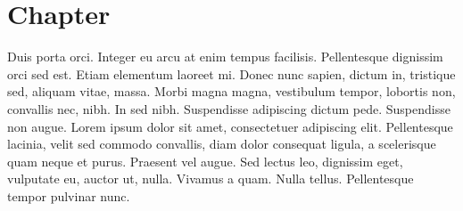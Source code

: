 \chapter{Chapter}

Duis porta orci. Integer eu arcu at enim tempus facilisis. Pellentesque dignissim orci sed est. Etiam elementum laoreet mi. Donec nunc sapien, dictum in, tristique sed, aliquam vitae, massa. Morbi magna magna, vestibulum tempor, lobortis non, convallis nec, nibh. In sed nibh. Suspendisse adipiscing dictum pede. Suspendisse non augue. Lorem ipsum dolor sit amet, consectetuer adipiscing elit. Pellentesque lacinia, velit sed commodo convallis, diam dolor consequat ligula, a scelerisque quam neque et purus. Praesent vel augue. Sed lectus leo, dignissim eget, vulputate eu, auctor ut, nulla. Vivamus a quam. Nulla tellus. Pellentesque tempor pulvinar nunc.

